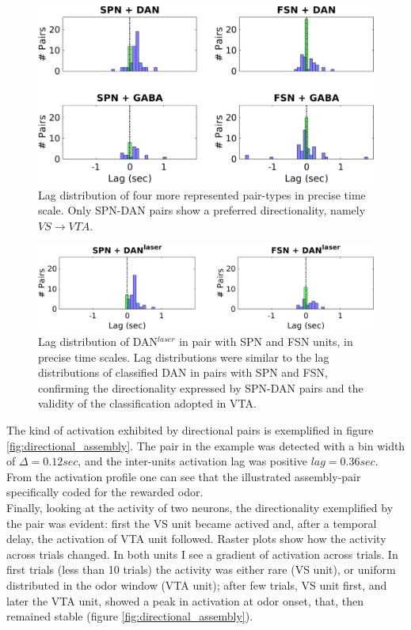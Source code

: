 \begin{figure}[H]
\centering
\includegraphics[scale=0.46]{figures/LagSec4Typo3VS.pdf}
\caption{Lag distribution of four more represented pair-types in precise time scale. Only SPN-DAN pairs show a preferred directionality, namely $VS\rightarrow VTA$.}
\label{fig:LagInSec4typo}
\end{figure}
\begin{figure}[H]
\centering
\includegraphics[scale=0.38]{figures/LagSecLaser3VS.pdf}
\caption{Lag distribution of DAN$^{laser}$ in pair with SPN and FSN units, in precise time scales. Lag distributions were similar to the lag distributions of classified DAN in pairs with SPN and FSN, confirming the directionality expressed by SPN-DAN pairs and the validity of the classification adopted in VTA.}
\label{fig:LagInSecLaser}
\end{figure}
The kind of activation exhibited by directional pairs is exemplified in figure \ref{fig:directional_assembly}. The pair in the example was detected with a bin width of $\Delta = 0.12 sec$, and the inter-units activation lag was positive $lag = 0.36 sec$. From the activation profile one can see that the illustrated assembly-pair specifically coded for the rewarded odor.\\Finally, looking at the activity of two neurons, the directionality exemplified by the pair was evident: first the VS unit became actived and, after a temporal delay, the activation of VTA unit followed. Raster plots show how the activity across trials changed. In both units I see a gradient of activation across trials. In first trials (less than 10 trials) the activity was either rare (VS unit), or uniform distributed in the odor window (VTA unit); after few trials, VS unit first, and later the VTA unit, showed a peak in activation at odor onset, that, then remained stable (figure \ref{fig:directional_assembly}).\\ 
